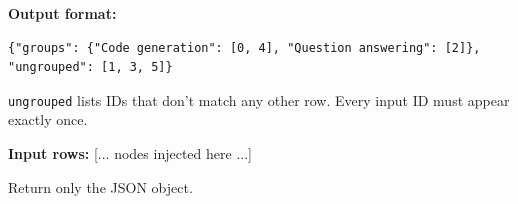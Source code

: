\begin{tcolorbox}[breakable,enhanced,colback=blue!3,colframe=blue!40!black,title={Prompt},fonttitle=\bfseries,left=8pt,right=8pt,top=6pt,bottom=6pt]
\textbf{Output format:}
\begin{verbatim}
{"groups": {"Code generation": [0, 4], "Question answering": [2]}, "ungrouped": [1, 3, 5]}
\end{verbatim}
\texttt{ungrouped} lists IDs that don't match any other row. Every input ID must appear exactly once.

\textbf{Input rows:}
[... nodes injected here ...]

Return only the JSON object.
\end{tcolorbox}

